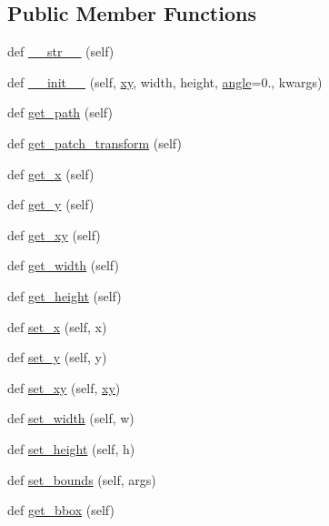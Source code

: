\subsection*{Public Member Functions}
\begin{DoxyCompactItemize}
\item 
def \hyperlink{classmatplotlib_1_1patches_1_1Rectangle_a5407eda04219c5c82d48378763b5eb33}{\+\_\+\+\_\+str\+\_\+\+\_\+} (self)
\item 
def \hyperlink{classmatplotlib_1_1patches_1_1Rectangle_a7d63154bd2a86b5e8e314a12c7728877}{\+\_\+\+\_\+init\+\_\+\+\_\+} (self, \hyperlink{classmatplotlib_1_1patches_1_1Rectangle_a7febcd40cac82459d66c33ddfc6ba09f}{xy}, width, height, \hyperlink{classmatplotlib_1_1patches_1_1Rectangle_afcd2b4e52594d4950ba836cbbffc90de}{angle}=0., kwargs)
\item 
def \hyperlink{classmatplotlib_1_1patches_1_1Rectangle_a4900143a0229a351567a0d3c187b7a8b}{get\+\_\+path} (self)
\item 
def \hyperlink{classmatplotlib_1_1patches_1_1Rectangle_a5382d4ef5328c44c12e661f3d1e5b849}{get\+\_\+patch\+\_\+transform} (self)
\item 
def \hyperlink{classmatplotlib_1_1patches_1_1Rectangle_a14fd904bb42952f55f14904028d46e7c}{get\+\_\+x} (self)
\item 
def \hyperlink{classmatplotlib_1_1patches_1_1Rectangle_a3678a7dc4fccc2fbd67eec412a8bd531}{get\+\_\+y} (self)
\item 
def \hyperlink{classmatplotlib_1_1patches_1_1Rectangle_a4b017693949cd5ea9f162f168f8e0855}{get\+\_\+xy} (self)
\item 
def \hyperlink{classmatplotlib_1_1patches_1_1Rectangle_af43e9c698f3b6b47aca02114005ca1d8}{get\+\_\+width} (self)
\item 
def \hyperlink{classmatplotlib_1_1patches_1_1Rectangle_ab833c765c31478f78f3fe695c340ec53}{get\+\_\+height} (self)
\item 
def \hyperlink{classmatplotlib_1_1patches_1_1Rectangle_aca87ee174e5cb581e19cac86fb761915}{set\+\_\+x} (self, x)
\item 
def \hyperlink{classmatplotlib_1_1patches_1_1Rectangle_a8a79507318cde4d59523b1de08461134}{set\+\_\+y} (self, y)
\item 
def \hyperlink{classmatplotlib_1_1patches_1_1Rectangle_aba57bf8a9cd2c16f5b53412b4228e5c7}{set\+\_\+xy} (self, \hyperlink{classmatplotlib_1_1patches_1_1Rectangle_a7febcd40cac82459d66c33ddfc6ba09f}{xy})
\item 
def \hyperlink{classmatplotlib_1_1patches_1_1Rectangle_a9212221e39f877049a0446154c4edfd8}{set\+\_\+width} (self, w)
\item 
def \hyperlink{classmatplotlib_1_1patches_1_1Rectangle_adbb43e91e339e31fe0aa6821e15c9b4b}{set\+\_\+height} (self, h)
\item 
def \hyperlink{classmatplotlib_1_1patches_1_1Rectangle_aea102be3007ac4f09548b7714d7dd461}{set\+\_\+bounds} (self, args)
\item 
def \hyperlink{classmatplotlib_1_1patches_1_1Rectangle_a734c08acbdb7843c61bd70bda008ce04}{get\+\_\+bbox} (self)
\end{DoxyCompactItemize}
